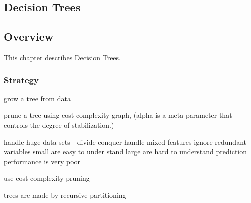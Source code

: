 

\renewcommand{\bibsection}{\subsection{\bibname}}
\begin{bibunit}

\chapter{Decision Trees}
\label{ch:trees}

\section{Overview}
This chapter describes Decision Trees.


\subsection{Strategy}

grow a tree from data

prune a tree using cost-complexity graph, (alpha is a meta parameter that controls the degree of stabilization.)

handle huge data sets - divide conquer 
handle mixed features
ignore redundant variables
small are easy to under stand
large are hard to understand
prediction performance is very poor

use cost complexity pruning


trees are made by recursive partitioning 



\end{bibunit}
